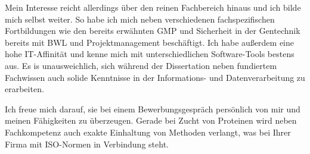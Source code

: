 Mein Interesse reicht allerdings über den reinen Fachbereich hinaus und ich bilde mich selbst weiter. So habe ich mich neben verschiedenen fachspezifischen Fortbildungen wie den bereits erwähnten GMP und Sicherheit in der Gentechnik bereits mit BWL und Projektmanagement beschäftigt. Ich habe außerdem eine hohe IT-Affinität und kenne mich mit unterschiedlichen Software-Tools bestens aus. Es is unausweichlich, sich während der Dissertation neben fundiertem Fachwissen auch solide Kenntnisse in der Informations- und Datenverarbeitung zu erarbeiten.\par %

Ich freue mich darauf, sie bei einem Bewerbungsgespräch persönlich von mir und meinen Fähigkeiten zu überzeugen.
Gerade bei Zucht von Proteinen wird neben Fachkompetenz auch exakte Einhaltung von Methoden verlangt, was bei Ihrer Firma mit ISO-Normen in Verbindung steht.
\par\vspace{1em}



